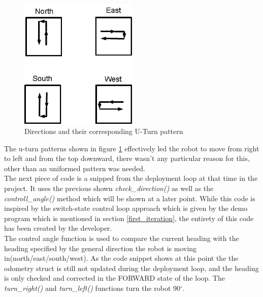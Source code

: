 \begin{figure}[h]
\centering
\includegraphics[width = 0.5\textwidth]{../../figures/direction_uturn_pattern}
\caption{Directions and their corresponding U-Turn pattern}
\label{directions_uturn_pattern}
\end{figure}

The u-turn patterns shown in figure \ref{directions_uturn_pattern} effectively led the robot to move from right to left and from the top downward, there wasn't any particular reason for this, other than an uniformed pattern was needed. \\
The next piece of code is a snipped from the deployment loop at that time in the project. It uses the previous shown \textit{check\_direction()} as well as the \textit{controll\_angle()} method which will be shown at a later point. While this code is inspired by the switch-state control loop approach which is given by the demo program which is mentioned in section \ref{first_iteration}, the entirety of this code has been created by the developer. \\
The control angle function is used to compare the current heading with the heading specified by the general direction the robot is moving in(north/east/south/west).
As the code snippet shows at this point the the odometry struct is still not updated during the deployment loop, and the heading is only checked and corrected in the FORWARD state of the loop.
The \textit{turn\_right()} and \textit{turn\_left()} functions turn the robot 90$^{\circ}$.

